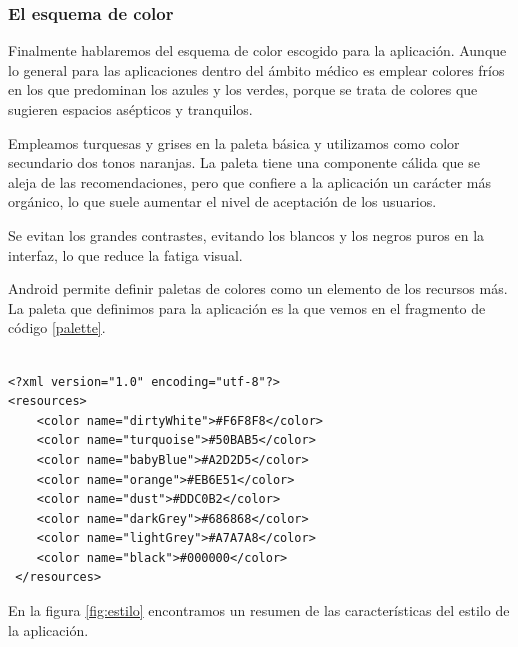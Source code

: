 \subsubsection{El esquema de color}
Finalmente hablaremos del esquema de color escogido para la aplicación.
Aunque lo general para las aplicaciones dentro del ámbito médico es emplear colores fríos en los que predominan los azules y los verdes, porque se trata de colores que sugieren espacios asépticos y  tranquilos.\par
Empleamos turquesas y grises en la paleta básica y utilizamos como color secundario dos tonos naranjas. La paleta tiene una componente cálida que se aleja de las recomendaciones, pero que confiere a la aplicación un carácter más orgánico, lo que suele aumentar el nivel de aceptación de los usuarios.\par
Se evitan los grandes contrastes, evitando los blancos y los negros puros en la interfaz, lo que reduce la fatiga visual.\medskip\par
Android permite definir paletas de colores como un elemento de los recursos más. La paleta que definimos para la aplicación es la que vemos en el fragmento de código \ref{palette}.

\lstset{escapechar=@,style=dicom}
\begin{lstlisting}[label=palette,caption=Esquema de color]

<?xml version="1.0" encoding="utf-8"?>
<resources>
    <color name="dirtyWhite">#F6F8F8</color>
    <color name="turquoise">#50BAB5</color>
    <color name="babyBlue">#A2D2D5</color>
    <color name="orange">#EB6E51</color>
    <color name="dust">#DDC0B2</color>
    <color name="darkGrey">#686868</color>
    <color name="lightGrey">#A7A7A8</color> 
    <color name="black">#000000</color>
 </resources>

\end{lstlisting}
En la figura \ref{fig:estilo} encontramos un resumen de las características del estilo de la aplicación.\par


